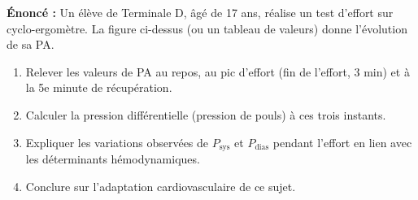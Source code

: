 \documentclass[11pt]{article}
\begin{document}
\begin{exoresolu}
\textbf{Énoncé :} Un élève de Terminale D, âgé de 17 ans, réalise un test d'effort sur cyclo-ergomètre. La figure ci-dessus (ou un tableau de valeurs) donne l'évolution de sa PA. 
\begin{enumerate}
    \item Relever les valeurs de PA au repos, au pic d'effort (fin de l'effort, 3 min) et à la 5e minute de récupération.
    \item Calculer la pression différentielle (pression de pouls) à ces trois instants.
    \item Expliquer les variations observées de $P_{\text{sys}}$ et $P_{\text{dias}}$ pendant l'effort en lien avec les déterminants hémodynamiques.
    \item Conclure sur l'adaptation cardiovasculaire de ce sujet.
\end{enumerate}


\end{exoresolu}
\end{document}
